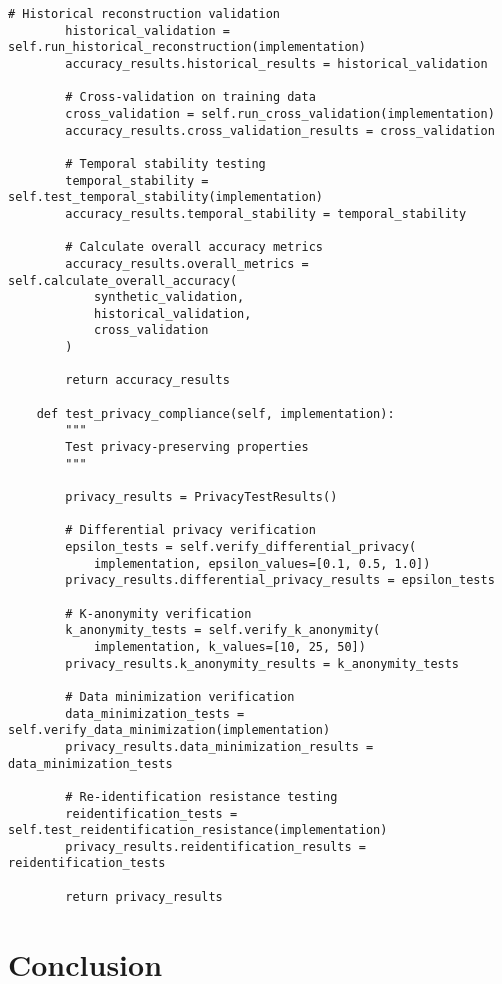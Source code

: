\documentclass[10pt,twocolumn]{IEEEtran}
\begin{document}
\begin{lstlisting}[caption={CPF Testing and Validation Framework}]
        # Historical reconstruction validation
        historical_validation = self.run_historical_reconstruction(implementation)
        accuracy_results.historical_results = historical_validation
        
        # Cross-validation on training data
        cross_validation = self.run_cross_validation(implementation)
        accuracy_results.cross_validation_results = cross_validation
        
        # Temporal stability testing
        temporal_stability = self.test_temporal_stability(implementation)
        accuracy_results.temporal_stability = temporal_stability
        
        # Calculate overall accuracy metrics
        accuracy_results.overall_metrics = self.calculate_overall_accuracy(
            synthetic_validation, 
            historical_validation, 
            cross_validation
        )
        
        return accuracy_results
    
    def test_privacy_compliance(self, implementation):
        """
        Test privacy-preserving properties
        """
        
        privacy_results = PrivacyTestResults()
        
        # Differential privacy verification
        epsilon_tests = self.verify_differential_privacy(
            implementation, epsilon_values=[0.1, 0.5, 1.0])
        privacy_results.differential_privacy_results = epsilon_tests
        
        # K-anonymity verification  
        k_anonymity_tests = self.verify_k_anonymity(
            implementation, k_values=[10, 25, 50])
        privacy_results.k_anonymity_results = k_anonymity_tests
        
        # Data minimization verification
        data_minimization_tests = self.verify_data_minimization(implementation)
        privacy_results.data_minimization_results = data_minimization_tests
        
        # Re-identification resistance testing
        reidentification_tests = self.test_reidentification_resistance(implementation)
        privacy_results.reidentification_results = reidentification_tests
        
        return privacy_results
\end{lstlisting}

\section{Conclusion}
\end{document}
